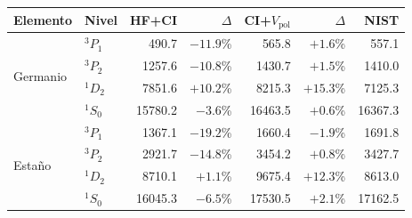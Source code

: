 \begin{tabular}{llrrrrr}
    \toprule
    \textbf{Elemento} & \textbf{Nivel} & \textbf{HF+CI} & $\Delta$ & \textbf{CI+$V_{\text{pol}}$} & $\Delta$ & \textbf{NIST} \\
    \midrule
    \multirow{4}{*}{Germanio}
     & $^3P_1$ & 490.7 & $-11.9$\% & 565.8 & $+1.6$\% & 557.1 \\
     & $^3P_2$ & 1257.6 & $-10.8$\% & 1430.7 & $+1.5$\% & 1410.0 \\
     & $^1D_2$ & 7851.6 & $+10.2$\% & 8215.3 & $+15.3$\% & 7125.3 \\
     & $^1S_0$ & 15780.2 & $-3.6$\% & 16463.5 & $+0.6$\% & 16367.3 \\
    \midrule
    \multirow{4}{*}{Estaño}
     & $^3P_1$ & 1367.1 & $-19.2$\% & 1660.4 & $-1.9$\% & 1691.8 \\
     & $^3P_2$ & 2921.7 & $-14.8$\% & 3454.2 & $+0.8$\% & 3427.7 \\
     & $^1D_2$ & 8710.1 & $+1.1$\% & 9675.4 & $+12.3$\% & 8613.0 \\
     & $^1S_0$ & 16045.3 & $-6.5$\% & 17530.5 & $+2.1$\% & 17162.5 \\
    \bottomrule
\end{tabular}
